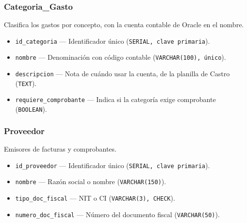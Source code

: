 \documentclass[11pt,letterpaper]{article}
\newcommand{\code}[1]{\nolinkurl{#1}}
\newcommand{\campo}[3]{\item \code{#1} --- #2 (\texttt{#3}).}
\begin{document}
\subsubsection{Categoria\_Gasto}
Clasifica los gastos por concepto, con la cuenta contable de Oracle en el nombre.
\begin{itemize}
  \campo{id_categoria}{Identificador único}{SERIAL, clave primaria}
  \campo{nombre}{Denominación con código contable}{VARCHAR(100), único}
  \campo{descripcion}{Nota de cuándo usar la cuenta, de la planilla de Castro}{TEXT}
  \campo{requiere_comprobante}{Indica si la categoría exige comprobante}{BOOLEAN}
\end{itemize}

\subsubsection{Proveedor}
Emisores de facturas y comprobantes.
\begin{itemize}
  \campo{id_proveedor}{Identificador único}{SERIAL, clave primaria}
  \campo{nombre}{Razón social o nombre}{VARCHAR(150)}
  \campo{tipo_doc_fiscal}{NIT o CI}{VARCHAR(3), CHECK}
  \campo{numero_doc_fiscal}{Número del documento fiscal}{VARCHAR(50)}
\end{itemize}
\end{document}

